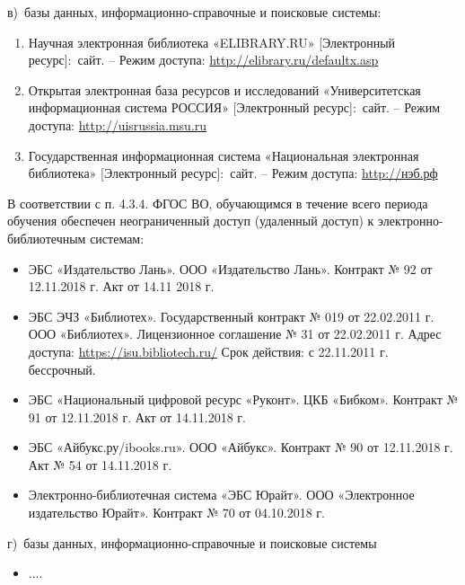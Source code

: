\documentclass[12pt]{scrartcl}
\newcommand{\rdf}[2]{#2}
\newenvironment{rdfctx}[1]{}{}
\begin{document}
\noindent в)\ базы данных, информационно-справочные и поисковые системы:
\begin{rdfctx}{\rdfsetctx{list}{syll wpdd:itemList !wpdd:EReferenceList !wpdd:ItemList}}
  \begin{enumerate}
  \item \rdf{list ^schema:member !wpdd:ListItem !wpdd:EReference}{Научная электронная библиотека «ELIBRARY.RU» [Электронный ресурс]\;:~сайт. – Режим доступа: \url{http://elibrary.ru/defaultx.asp}}
  \item \rdf{list ^schema:member !wpdd:ListItem !wpdd:EReference}{Открытая электронная база ресурсов и исследований «Университетская информационная система РОССИЯ» [Электронный ресурс]\;:~сайт. – Режим доступа: \url{http://uisrussia.msu.ru}}
  \item \rdf{list ^schema:member !wpdd:ListItem !wpdd:EReference}{Государственная информационная система «Национальная электронная библиотека» [Электронный ресурс]\;:~сайт. – Режим доступа: \url{http://нэб.рф}}
  \end{enumerate}
\end{rdfctx}
  В соответствии с п. 4.3.4. ФГОС ВО, обучающимся в течение всего периода обучения обеспечен неограниченный доступ (удаленный доступ) к электронно-библиотечным системам:
\begin{rdfctx}{\rdfsetctx{list}{syll wpdd:itemList !wpdd:EContractList !wpdd:ItemList}}
  \begin{itemize}
  \item \rdf{list ^schema:member !wpdd:ListItem !wpdd:EReference}{ЭБС «Издательство Лань». ООО «Издательство Лань». Контракт № 92 от 12.11.2018 г. Акт от 14.11 2018 г.}
  \item \rdf{list ^schema:member !wpdd:ListItem !wpdd:EReference}{ЭБС ЭЧЗ «Библиотех». Государственный контракт № 019 от 22.02.2011 г. ООО «Библиотех». Лицензионное соглашение № 31 от 22.02.2011 г. Адрес доступа: \url{https://isu.bibliotech.ru/} Срок действия: с 22.11.2011 г. бессрочный.}
  \item \rdf{list ^schema:member !wpdd:ListItem !wpdd:EReference}{ЭБС «Национальный цифровой ресурс «Руконт». ЦКБ «Бибком». Контракт № 91 от 12.11.2018 г. Акт от 14.11.2018 г.}
  \item \rdf{list ^schema:member !wpdd:ListItem !wpdd:EReference}{ЭБС «Айбукс.ру/ibooks.ru». ООО «Айбукс». Контракт № 90 от 12.11.2018 г. Акт № 54 от 14.11.2018 г.}
  \item \rdf{list ^schema:member !wpdd:ListItem !wpdd:EReference}{Электронно-библиотечная система «ЭБС Юрайт». ООО «Электронное издательство Юрайт». Контракт № 70 от 04.10.2018 г.}
  \end{itemize}
\end{rdfctx}
\noindent г)\ базы данных, информационно-справочные и поисковые системы
\begin{rdfctx}{\rdfsetctx{list}{syll wpdd:itemList !wpdd:InternetResources !wpdd:ItemList}}
  \begin{itemize}
  \item \rdf{list ^schema:member !wpdd:ListItem !wpdd:InternetResource}{....}
  \end{itemize}
\end{rdfctx}
\end{document}
